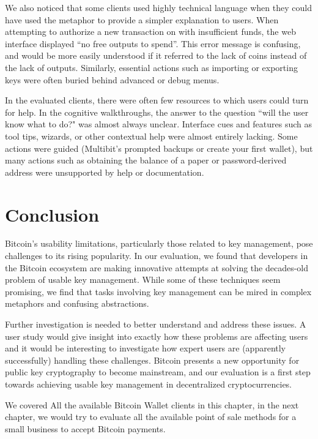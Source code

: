 We also noticed that some clients used highly technical language when they could have used the metaphor to provide a simpler explanation to users. When attempting to authorize a new transaction on \block with insufficient funds, the web interface displayed ``no free outputs to spend''. This error message is confusing, and would be more easily understood if it referred to the lack of coins instead of the lack of outputs. Similarly, essential actions such as importing or exporting keys were often buried behind advanced or debug menus. 

In the evaluated clients, there were often few resources to which users could turn for help. In the cognitive walkthroughs, the answer to the question ``will the user know what to do?" was almost always unclear. Interface cues and features such as tool tips, wizards, or other contextual help were almost entirely lacking. Some actions were guided (\eg Multibit's prompted backups or create your first wallet), but many actions such as obtaining the balance of a paper or password-derived address were unsupported by help or documentation.  



\section{Conclusion}
Bitcoin's usability limitations, particularly those related to key management, pose challenges to its rising popularity. In our evaluation, 
we found that developers in the Bitcoin ecosystem are making innovative attempts at solving the decades-old problem of usable key management. While some of these techniques seem promising, we find that tasks involving key management can be mired in complex metaphors and confusing abstractions.

Further investigation is needed to better understand and address these issues. A user study would give insight into exactly how these problems are affecting users and it would be interesting to investigate how expert users are (apparently successfully) handling these challenges. Bitcoin presents a new opportunity for public key cryptography to become mainstream, and our evaluation is a first step towards achieving usable key management in decentralized cryptocurrencies. 

We covered All the available Bitcoin Wallet clients in this chapter, in the next chapter, we would try to evaluate all the available point of sale methods for a small business to accept Bitcoin payments.



